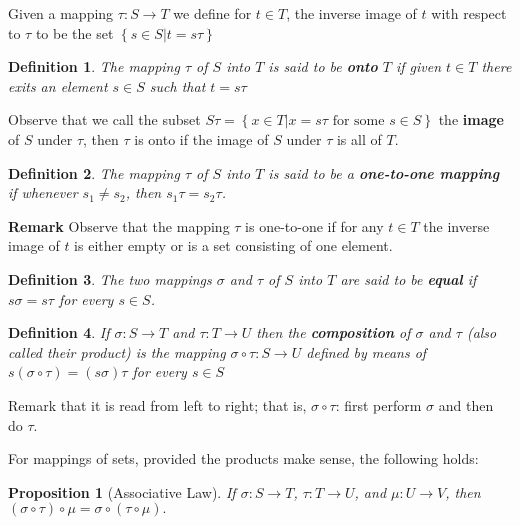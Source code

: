 \documentclass[11pt,a4paper]{article}
\newtheorem{define}{Definition}
\newtheorem{claim}{Proposition}
\begin{document}
Given a mapping $ \tau: S \rightarrow T$ we define for $t \in T$, the inverse image of $t$ with respect to $ \tau$ to be the set $ \left\lbrace s \in S \vert t = s\tau \right\rbrace $

\begin{define}
	The mapping $ \tau $ of $S$ into $T$ is said to be \textbf{onto} $T$ if given $ t\in T$ there exits an element $ s \in S $ such that $ t = s\tau $
\end{define}
Observe that we call the subset $S\tau = \left\lbrace x \in T \vert x = s\tau \text{ for some  } s \in S \right\rbrace$ the \textbf{image} of $S$ under $ \tau $, then $ \tau $ is onto if the image of $S$ under $ \tau $ is all of $T$.

\begin{define}
	The mapping $ \tau $ of $S$ into $T$ is said to be a \textbf{one-to-one mapping} if whenever $ s_1 \neq s_2 $, then $ s_1\tau = s_2\tau$.
\end{define}
\textbf{Remark} Observe that the mapping $ \tau$ is one-to-one if for any $ t \in T$ the inverse image of $t$ is either empty or is a set consisting of one element.

\begin{define}
	The two mappings $ \sigma $ and $\tau$ of $S$ into $T$ are said to be \textbf{equal} if $s\sigma= s\tau $ for every $ s \in S$.
\end{define}

\begin{define}
	If $\sigma: S \rightarrow T$ and $\tau: T \rightarrow U$ then the \textbf{composition} of $ \sigma $ and $\tau$ (also called their product) is the mapping $ \sigma \circ \tau: S \rightarrow U$ defined by means of $s( \sigma \circ \tau) = (s\sigma)\tau $ for every $ s \in S$
\end{define}
Remark that it is read from left to right; that is, $ \sigma \circ \tau$: first perform $ \sigma $ and then do $ \tau$. \par 

For mappings of sets, provided the products make sense, the following holds:

\begin{claim}[Associative Law] \label{pro:Associativelawmaps}
	If $ \sigma: S \rightarrow T$, $\tau: T \rightarrow U$, and $ \mu: U \rightarrow V$, then $ (\sigma \circ \tau) \circ \mu = \sigma \circ ( \tau \circ \mu).$
\end{claim}
\end{document}
